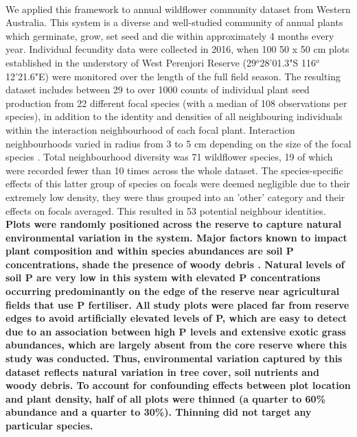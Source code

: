 \begin{refsection}
        \paragraph{}
        We applied this framework to annual wildflower community dataset from Western Australia. This system is a diverse and well-studied community of annual plants which germinate, grow, set seed and die within approximately 4 months every year. Individual fecundity data were collected in 2016, when 100 50 x 50 cm plots established in the understory of West Perenjori Reserve (29$^o$28'01.3"S 116$^o$12'21.6"E) were monitored over the length of the full field season. The resulting dataset includes between 29 to over 1000 counts of individual plant seed production from 22 different focal species (with a median of 108 observations per species), in addition to the identity and densities of all neighbouring individuals within the interaction neighbourhood of each focal plant. Interaction neighbourhoods varied in radius from 3 to 5 cm depending on the size of the focal species \parencite{Martyn2020}. Total neighbourhood diversity was 71 wildflower species, 19 of which were recorded fewer than 10 times across the whole dataset. The species-specific effects of this latter group of species on focals were deemed negligible due to their extremely low density, they were thus grouped into an 'other' category and their effects on focals averaged. This resulted in 53 potential neighbour identities. \textbf{Plots were randomly positioned across the reserve to capture natural environmental variation in the system.  Major factors known to impact plant composition and within species abundances are soil P concentrations, shade the presence of woody debris \parencite{Dwyer2015}. Natural levels of soil P are very low in this system with elevated P concentrations occurring predominantly on the edge of the reserve near agricultural fields that use P fertiliser. All study plots were placed far from reserve edges to avoid artificially elevated levels of P, which are easy to detect due to an association between high P levels and extensive exotic grass abundances, which are largely absent from the core reserve where this study was conducted. Thus, environmental variation captured by this dataset reflects natural variation in tree cover, soil nutrients and woody debris. To account for confounding effects between plot location and plant density, half of all plots were thinned (a quarter to 60\% abundance and a quarter to 30\%). Thinning did not target any particular species.} 


\end{refsection}
